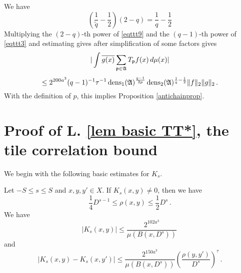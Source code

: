 We have
\begin{equation}
    \left (\frac 1{\tilde{q}} -\frac 12\right) (2-q)= \frac 1q -\frac 12
\end{equation}
Multiplying  the $(2-q)$-th power of  \eqref{eqttt9} and the $(q-1)$-th power of \eqref{eqttt3}
and estimating gives after simplification of some factors gives
\begin{equation}\label{eqttt8}
    |\int \overline{g(x)} \sum_{\mathfrak p \in \mathfrak{A}} T_{\mathfrak p} f(x)\, d\mu(x)|
    \end{equation}
    \begin{equation}
        \le  2^{200a^3}({q}-1)^{-1} \tau^{-1}\operatorname{\operatorname{dens}}_1(\mathfrak{A})^{\frac {q-1}{2p}}\operatorname{\operatorname{dens}}_2(\mathfrak{A})^{\frac 1{q}-\frac 12}  \|f\|_2\|g\|_2\, .
    \end{equation}
    With the definition of $p$, this  implies
Proposition \ref{antichainprop}.


\section{Proof of L. \ref{lem basic TT*}, the tile correlation bound }\label{sec tile operator}
We begin with the following basic estimates for $K_s$.
\begin{lemma}
Let $-S\le s\le S$ and $x,y,y'\in X$.
If $K_s(x,y)\neq 0$, then we have
\begin{equation}\label{supp Ks}
    \frac{1}{4} D^{s-1} \leq \rho(x,y) \leq \frac{1}{2} D^s\, .
\end{equation}
We have
\begin{equation}
    \label{eq Ks size}
    |K_s(x,y)|\le \frac{2^{102 a^3}}{\mu(B(x, D^{s}))}\,
\end{equation}
and \begin{equation}
    \label{eq Ks smooth}
    |K_s(x,y)-K_s(x, y')|\le \frac{2^{150a^3}}{\mu(B(x, D^{s}))}
    \left(\frac{ \rho(y,y')}{D^s}\right)^{\tau}\,.
\end{equation}
\end{lemma}

